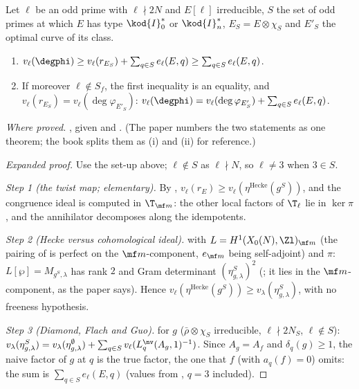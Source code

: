 \begin{sloppypar}
\begin{theorem}\label{thm:paper:quant}
Let $\ell$ be an odd prime with $\ell\nmid2N$ and $E[\ell]$ irreducible, $S$ the set of odd primes at which $E$ has type $\kod{I}_0^*$ or $\kod{I}_n^*$, $E_S=E\otimes\chi_S$ and $E'_S$ the optimal
curve of its class.
\begin{enumerate}[label=(\roman*)]
\item $v_\ell(\degphi)\ge v_\ell(r_{E_S})+\sum_{q\in S}e_\ell(E,q)\ge\sum_{q\in S}e_\ell(E,q)$.
\item If moreover $\ell\notin S_f$, the first inequality is an equality, and $v_\ell(r_{E_S})=v_\ell(\deg\varphi_{E'_S})$: $v_\ell(\degphi)=v_\ell(\deg\varphi_{E'_S})+\sum_{q\in S}e_\ell(E,q)$.
\end{enumerate}
\end{theorem}

\noindent\emph{Where proved.} , given  and . (The paper numbers the two statements as one theorem; the book splits them
as (i) and (ii) for reference.)

\begin{proof}[Expanded proof]
Use the set-up above; $\ell\notin S$ as $\ell\nmid N$, so $\ell\ne3$ when $3\in S$.

\emph{Step 1 (the twist map; elementary).} By , $v_\ell(r_E)\ge v_\ell(\eta^{\mathrm{Hecke}}(g^S))$, and the congruence ideal is computed in $\T_{\mf m}$: the other local
factors of $\T_\ell$ lie in $\ker\pi$, and the annihilator decomposes along the idempotents.

\emph{Step 2 (Hecke versus cohomological ideal).}  with $L=H^1(X_0(N),\Zl)_{\mf m}$ (the pairing of  is perfect on the $\mf m$-component, $e_{\mf m}$ being
self-adjoint) and $\pi$: $L[\wp]=M_{g^S,\lambda}$ has rank $2$ and Gram determinant $(\eta^S_{g,\lambda})^2$ (; it lies in the $\mf m$-component, as the paper says). Hence $v_\ell(\eta^{\mathrm{Hecke}}(g^S))\ge v_\lambda(\eta^S_{g,\lambda})$, with no freeness hypothesis.

\emph{Step 3 (Diamond, Flach and Guo).}  for $g$ ($\bar\rho\otimes\chi_S$ irreducible, $\ell\nmid2N_S$, $\ell\notin S$): $v_\lambda(\eta^S_{g,\lambda})=v_\lambda(\eta^\emptyset_{g,\lambda})+\sum_{q\in S}v_\ell(L^{\nv}_q(A_g,1)^{-1})$.
Since $A_g=A_f$ and $\delta_q(g)\ge1$, the naive factor of $g$ at $q$ is the true factor, the one that $f$ (with $a_q(f)=0$) omits: the sum is $\sum_{q\in S}e_\ell(E,q)$ (values from
, $q=3$ included).


\end{proof}
\end{sloppypar}
